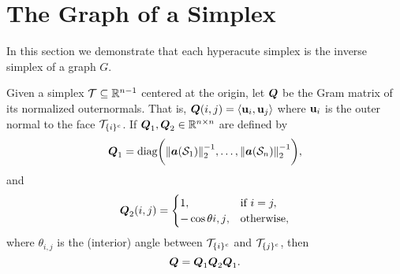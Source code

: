 \section{The Graph of a Simplex}
\label{sec:simplex_to_graph}
In this section we demonstrate that each hyperacute simplex is the inverse simplex of a graph $G$. 

\begin{lemma}
Given a simplex $\mathcal{T}\subseteq\mathbb{R}^{n-1}$ centered at the origin, let $\vb*{Q}$ be the Gram matrix of its normalized outernormals. That is, $\vb*{Q}(i,j)=\langle \vb{u}_i,\vb{u}_j\rangle$ where $\vb{u}_{i}$ is the outer normal to the face $\mathcal{T}_{\{i\}^c}$. If $\vb*{Q}_1,\vb*{Q}_2\in\mathbb{R}^{n\times n}$ are defined by 
\begin{equation*}
\vb*{Q}_1 = \text{diag}\bigg(\norm{\vb*{a}(\mathcal{S}_1)}_2^{-1},\dots,\norm{\vb*{a}(\mathcal{S}_n)}_2^{-1}\bigg),
\end{equation*}
and 
\begin{equation*}
\vb*{Q}_2(i,j) = \begin{cases}
1,& \text{if } i=j,\\
-\cos\theta{i,j},&\text{otherwise},
\end{cases} 
\end{equation*}
where $\theta_{i,j}$ is the (interior) angle between $\mathcal{T}_{\{i\}^c}$ and $\mathcal{T}_{\{j\}^c}$, then 
\begin{equation*}
\vb*{Q} = \vb*{Q}_1 \vb*{Q}_2 \vb*{Q}_1.
\end{equation*}
\end{lemma}


